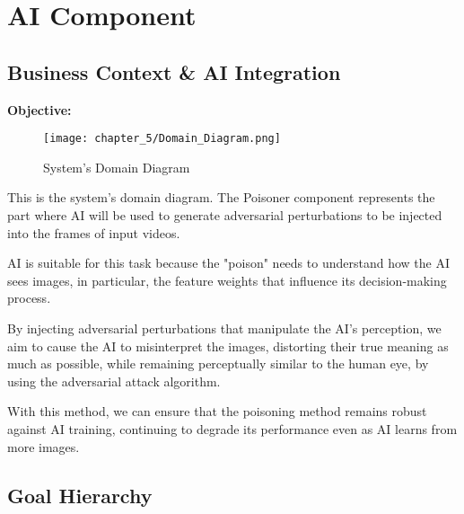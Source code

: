 \chapter{AI Component}
\label{chap:ai-component}

\section{Business Context & AI Integration}
\label{section:business-context-and-AI-integration}
\textbf{Objective:}

\begin{figure}[h]
    \centering
    \texttt{[image: chapter\_5/Domain\_Diagram.png]}
    \caption{System's Domain Diagram}
\end{figure}

This is the system's domain diagram. The Poisoner component represents the part where AI will be used to generate adversarial perturbations to be injected into the frames of input videos.

AI is suitable for this task because the "poison" needs to understand how the AI sees images, in particular, the feature weights that influence its decision-making process. 

By injecting adversarial perturbations that manipulate the AI’s perception, we aim to cause the AI to misinterpret the images, distorting their true meaning as much as possible, while remaining perceptually similar to the human eye, by using the adversarial attack algorithm.

With this method, we can ensure that the poisoning method remains robust against AI training, continuing to degrade its performance even as AI learns from more images.

\section{Goal Hierarchy}
\label{section:goal-hierarchy}

